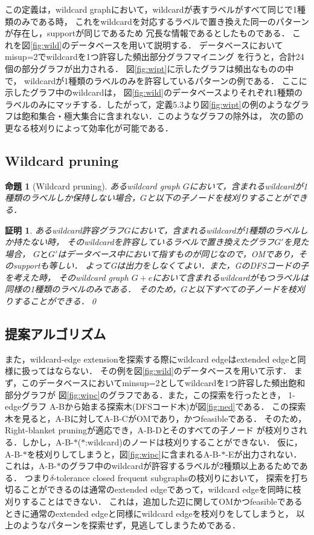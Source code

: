\documentclass[12pt,fleqn]{jsotsuron}
\newtheorem{Proof}{証明}[section]
\newtheorem{Lemma}{命題}[section]
\begin{document}
この定義は，wildcard graphにおいて，wildcardが表すラベルがすべて同じで1種類のみである時，
これをwildcardを対応するラベルで置き換えた同一のパターンが存在し，supportが同じであるため
冗長な情報であるとしたものである．
これを図\ref{fig:wild}のデータベースを用いて説明する．
データベースにおいてmisup=2でwildcardを1つ許容した頻出部分グラフマイニング
を行うと，合計24個の部分グラフが出力される．
図\ref{fig:wipt}に示したグラフは頻出なものの中で，
wildcardが1種類のラベルのみを許容しているパターンの例である．
ここに示したグラフ中のwildcardは，
図\ref{fig:wild}のデータベースよりそれぞれ1種類の
ラベルのみにマッチする．したがって，定義5.3より図\ref{fig:wipt}の例のようなグラフは飽和集合・極大集合に含まれない．このようなグラフの除外は，
次の節の更なる枝刈りによって効率化が可能である．

\subsection{Wildcard pruning}
\label{wildprun}
\begin{Lemma}[Wildcard pruning]
あるwildcard graph $G$において，含まれるwildcardが1種類のラベルしか保持しない場合，$G$と以下の子ノードを枝刈りすることができる．
\end{Lemma}

\begin{Proof}
あるwildcard許容グラフ$G$において，含まれるwildcardが1種類のラベルしか持たない時，
そのwildcardを許容しているラベルで置き換えたグラフ$G'$を見た場合，
$GとG'$はデータベース中において指すものが同じなので，OMであり，そのsupportも等しい．
よってGは出力をしなくてよい．また，GのDFSコードの子を考えた時，
そのwildcard graph $G+e$において含まれるwildcardがもつラベルは同様の1種類のラベルのみである．
そのため，$G$と以下すべての子ノードを枝刈りすることができる．\qed
\end{Proof}

\subsection{提案アルゴリズム}
また，wildcard-edge extensionを探索する際にwildcard edgeはextended edgeと同様に扱ってはならない．
その例を図\ref{fig:wild}のデータベースを用いて示す．
まず，このデータベースにおいてminsup=2としてwildcardを1つ許容した頻出飽和部分グラフが
図\ref{fig:wipc}のグラフである．また，この探索を行ったとき，
1-edgeグラフ A-Bから始まる探索木(DFSコード木)が図\ref{fig:ned}である．
この探索木を見ると，A-Bに対してA-B-CがOMであり，かつfeasibleである．
そのため，Right-blanket pruningが適応でき，A-B-Dとそのすべての子ノード
が枝刈りされる．しかし，A-B-$\ast$($\ast$:wildcard)のノードは枝刈りすることができない．
仮に，A-B-$\ast$を枝刈りしてしまうと，図\ref{fig:wipc}に含まれるA-B-$\ast$-Eが出力されない．
これは，A-B-$\ast$のグラフ中のwildcardが許容するラベルが2種類以上あるためである．
つまり$\delta$-tolerance closed frequent subgraphsの枝刈りにおいて，
探索を打ち切ることができるのは通常のextended edgeであって，wildcard edgeを同時に枝刈りすることはできない．
これは，追加した辺に関してOMかつfeasibleであるときに通常のextended edgeと同様にwildcard edgeを枝刈りをしてしまうと，
以上のようなパターンを探索せず，見逃してしまうためである．
\end{document}
